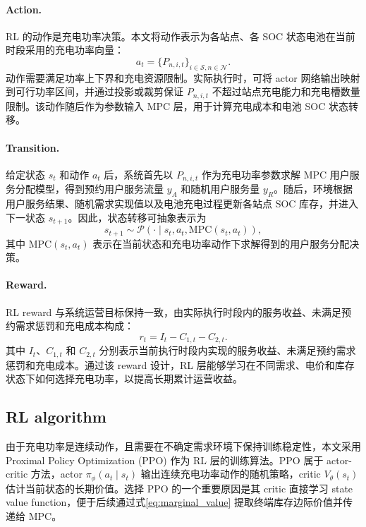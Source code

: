 \documentclass[12pt,hyperref,a4paper,UTF8]{ctexart}
\begin{document}
\paragraph{Action.}
RL 的动作是充电功率决策。本文将动作表示为各站点、各 SOC 状态电池在当前时段采用的充电功率向量：
\begin{equation}
a_t=
\{P_{n,i,t}\}_{i\in\mathcal{S},n\in\mathcal{N}}.
\label{eq:rl_action}
\end{equation}
动作需要满足功率上下界和充电资源限制。实际执行时，可将 actor 网络输出映射到可行功率区间，并通过投影或裁剪保证 $P_{n,i,t}$ 不超过站点充电能力和充电槽数量限制。该动作随后作为参数输入 MPC 层，用于计算充电成本和电池 SOC 状态转移。

\paragraph{Transition.}
给定状态 $s_t$ 和动作 $a_t$ 后，系统首先以 $P_{n,i,t}$ 作为充电功率参数求解 MPC 用户服务分配模型，得到预约用户服务流量 $y_A$ 和随机用户服务量 $y_R$。随后，环境根据用户服务结果、随机需求实现值以及电池充电过程更新各站点 SOC 库存，并进入下一状态 $s_{t+1}$。因此，状态转移可抽象表示为
\begin{equation}
s_{t+1}\sim \mathcal{P}(\cdot\mid s_t,a_t,\mathrm{MPC}(s_t,a_t)),
\label{eq:rl_transition}
\end{equation}
其中 $\mathrm{MPC}(s_t,a_t)$ 表示在当前状态和充电功率动作下求解得到的用户服务分配决策。

\paragraph{Reward.}
RL reward 与系统运营目标保持一致，由实际执行时段内的服务收益、未满足预约需求惩罚和充电成本构成：
\begin{equation}
r_t=I_t-C_{1,t}-C_{2,t}.
\label{eq:rl_reward}
\end{equation}
其中 $I_t$、$C_{1,t}$ 和 $C_{2,t}$ 分别表示当前执行时段内实现的服务收益、未满足预约需求惩罚和充电成本。通过该 reward 设计，RL 层能够学习在不同需求、电价和库存状态下如何选择充电功率，以提高长期累计运营收益。

\subsection{RL algorithm}

由于充电功率是连续动作，且需要在不确定需求环境下保持训练稳定性，本文采用 Proximal Policy Optimization (PPO) 作为 RL 层的训练算法。PPO 属于 actor-critic 方法，actor $\pi_{\phi}(a_t\mid s_t)$ 输出连续充电功率动作的随机策略，critic $V_{\theta}(s_t)$ 估计当前状态的长期价值。选择 PPO 的一个重要原因是其 critic 直接学习 state value function，便于后续通过式\eqref{eq:marginal_value} 提取终端库存边际价值并传递给 MPC。
\end{document}
